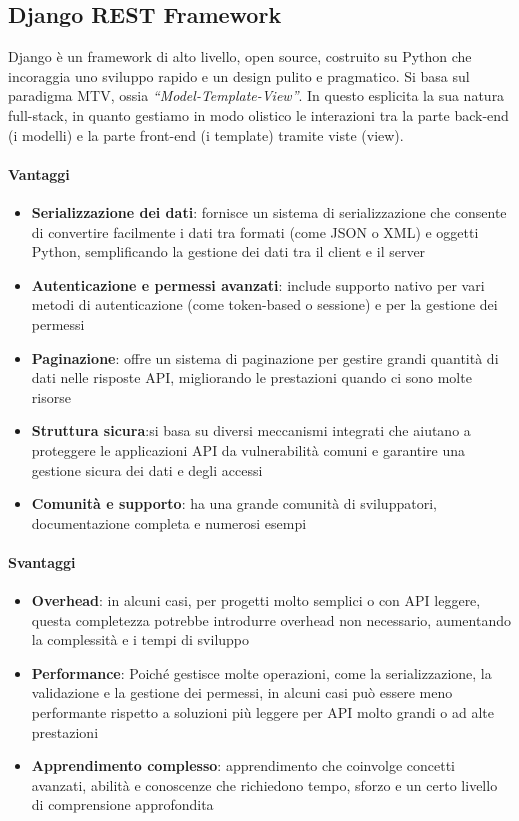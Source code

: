 \documentclass{article}
\begin{document}
\subsection{Django REST Framework}
Django è un framework di alto livello, open source, costruito su Python 
che incoraggia uno sviluppo rapido e un design pulito e pragmatico. 
Si basa sul paradigma MTV, ossia \textit{“Model-Template-View”}. In 
questo esplicita la sua natura full-stack, in quanto gestiamo in modo 
olistico le interazioni tra la parte back-end (i modelli) e la parte 
front-end (i template) tramite viste (view).
\paragraph*{Vantaggi}
\begin{itemize}
    \item \textbf{Serializzazione dei dati}: fornisce un sistema di 
    serializzazione che consente di convertire facilmente i dati tra 
    formati (come JSON o XML) e oggetti Python, semplificando la 
    gestione dei dati tra il client e il server
    \item \textbf{Autenticazione e permessi avanzati}: include supporto 
    nativo per vari metodi di autenticazione (come token-based o 
    sessione) e per la gestione dei permessi
    \item \textbf{Paginazione}: offre un sistema di paginazione per 
    gestire grandi quantità di dati nelle risposte API, migliorando 
    le prestazioni quando ci sono molte risorse
    \item \textbf{Struttura sicura}:si basa su diversi meccanismi 
    integrati che aiutano a proteggere le applicazioni API da 
    vulnerabilità comuni e garantire una gestione sicura dei dati e 
    degli accessi
    \item \textbf{Comunità e supporto}: ha una grande comunità di 
    sviluppatori, documentazione completa e numerosi esempi
\end{itemize}
\paragraph*{Svantaggi}
\begin{itemize}
    \item \textbf{Overhead}: in alcuni casi, per progetti molto semplici 
    o con API leggere, questa completezza potrebbe introdurre overhead 
    non necessario, aumentando la complessità e i tempi di sviluppo
    \item \textbf{Performance}: Poiché  gestisce molte operazioni, come 
    la serializzazione, la validazione e la gestione dei permessi, in 
    alcuni casi può essere meno performante rispetto a soluzioni più 
    leggere per API molto grandi o ad alte prestazioni
    \item \textbf{Apprendimento complesso}: apprendimento che coinvolge 
    concetti avanzati, abilità e conoscenze che richiedono tempo, sforzo 
    e un certo livello di comprensione approfondita
\end{itemize}
\end{document}
